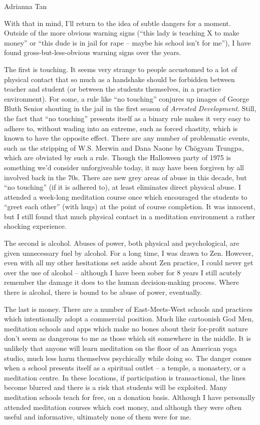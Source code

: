 \documentclass{letter}
\newcommand\hr{\par\vspace{-.5\ht\strutbox}\noindent\hrulefill\par}
\begin{document}
\begin{letter}{Adrianna Tan}
\hr

With that in mind, I'll return to the idea of subtle dangers for a moment.
Outside of the more obvious warning signs (``this lady is teaching X to make money'' or ``this dude is in jail for rape -- maybe his school isn't for me''), I have found gross-but-less-obvious warning signs over the years.

The first is touching.
It seems very strange to people accustomed to a lot of physical contact that so much as a handshake should be forbidden between teacher and student (or between the students themselves, in a practice environment).
For some, a rule like ``no touching'' conjures up images of George Bluth Senior shouting in the jail in the first season of \textit{Arrested Development}.
Still, the fact that ``no touching'' presents itself as a binary rule makes it very easy to adhere to, without wading into an extreme, such as forced chastity, which is known to have the opposite effect.
There are any number of problematic events, such as the stripping of W.S. Merwin and Dana Naone by Chögyam Trungpa, which are obviated by such a rule.
Though the Halloween party of 1975 is something we'd consider unforgiveable today, it may have been forgiven by all involved back in the 70s.
There are new grey areas of abuse in this decade, but ``no touching'' (if it is adhered to), at least eliminates direct physical abuse.
I attended a week-long meditation course once which encouraged the students to ``greet each other'' (with hugs) at the point of course completion.
It was innocent, but I still found that much physical contact in a meditation environment a rather shocking experience.

The second is alcohol.
Abuses of power, both physical and psychological, are given unnecessary fuel by alcohol.
For a long time, I was drawn to Zen.
However, even with all my other hesitations set aside about Zen practice, I could never get over the use of alcohol -- although I have been sober for 8 years I still acutely remember the damage it does to the human decision-making process.
Where there is alcohol, there is bound to be abuse of power, eventually.

The last is money.
There are a number of East-Meets-West schools and practices which intentionally adopt a commercial position.
Much like cartoonish God Men, meditation schools and apps which make no bones about their for-profit nature don't seem as dangerous to me as those which sit somewhere in the middle.
It is unlikely that anyone will learn meditation on the floor of an American yoga studio, much less harm themselves psychically while doing so.
The danger comes when a school presents itself as a spiritual outlet -- a temple, a monastery, or a meditation centre.
In these locations, if participation is transactional, the lines become blurred and there is a risk that students will be exploited.
Many meditation schools teach for free, on a donation basis.
Although I have personally attended meditation courses which cost money, and although they were often useful and informative, ultimately none of them were for me.


\end{letter}
\end{document}
